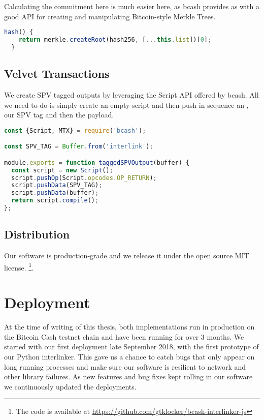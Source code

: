 Calculating the commitment here is much easier here, as bcash provides as with a good API for creating and manipulating Bitcoin-style Merkle Trees.

\begin{lstlisting}[language=js]
  hash() {
    return merkle.createRoot(hash256, [...this.list])[0];
  }
\end{lstlisting}

\subsection{Velvet Transactions}
We create SPV tagged outputs by leveraging the Script API offered by bcash. All we need to do is simply create an empty script and then push in sequence an , our SPV tag and then the payload.

\begin{lstlisting}[language=js]
const {Script, MTX} = require('bcash');

const SPV_TAG = Buffer.from('interlink');

module.exports = function taggedSPVOutput(buffer) {
  const script = new Script();
  script.pushOp(Script.opcodes.OP_RETURN);
  script.pushData(SPV_TAG);
  script.pushData(buffer);
  return script.compile();
};
\end{lstlisting}

\subsection{Distribution}

Our software is production-grade and we release it under the open source MIT license.
\footnote{The code is available at \url{https://github.com/gtklocker/bcash-interlinker-js}}.

\section{Deployment}
At the time of writing of this thesis, both implementations run in production on the Bitcoin Cash testnet chain and have been running for over 3 months. We started with our first deployment late September 2018, with the first prototype of our Python interlinker. This gave us a chance to catch bugs that only appear on long running processes and make sure our software is resilient to network and other library failures. As new features and bug fixes kept rolling in our software we continuously updated the deployments.

